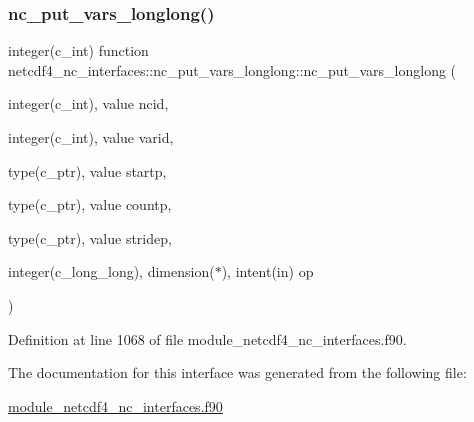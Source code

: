 \subsubsection{\texorpdfstring{nc\+\_\+put\+\_\+vars\+\_\+longlong()}{nc\_put\_vars\_longlong()}}
{\footnotesize\ttfamily integer(c\+\_\+int) function netcdf4\+\_\+nc\+\_\+interfaces\+::nc\+\_\+put\+\_\+vars\+\_\+longlong\+::nc\+\_\+put\+\_\+vars\+\_\+longlong (\begin{DoxyParamCaption}\item[{integer(c\+\_\+int), value}]{ncid,  }\item[{integer(c\+\_\+int), value}]{varid,  }\item[{type(c\+\_\+ptr), value}]{startp,  }\item[{type(c\+\_\+ptr), value}]{countp,  }\item[{type(c\+\_\+ptr), value}]{stridep,  }\item[{integer(c\+\_\+long\+\_\+long), dimension($\ast$), intent(in)}]{op }\end{DoxyParamCaption})}



Definition at line 1068 of file module\+\_\+netcdf4\+\_\+nc\+\_\+interfaces.\+f90.



The documentation for this interface was generated from the following file\+:\begin{DoxyCompactItemize}
\item 
\hyperlink{module__netcdf4__nc__interfaces_8f90}{module\+\_\+netcdf4\+\_\+nc\+\_\+interfaces.\+f90}\end{DoxyCompactItemize}
